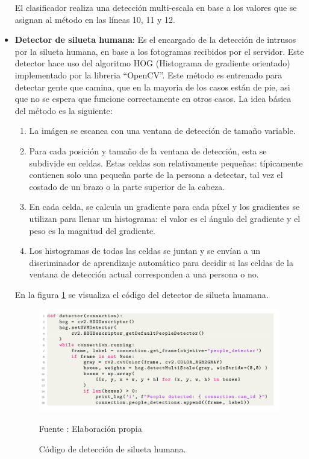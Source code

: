 \begin{itemize}
    El clasificador realiza una detección multi-escala en base a los valores que se asignan al método en las líneas 10, 11 y 12.\\
    \item \textbf{Detector de silueta humana}:
    Es el encargado de la detección de intrusos por la silueta humana, en base a los fotogramas recibidos por el servidor. Este detector hace uso del algoritmo HOG (Histograma de gradiente orientado) implementado por la libreria ``OpenCV''. Este método es entrenado para detectar gente que camina, que en la mayoria de los casos están de pie, asi que no se espera que funcione correctamente en otros casos.
    La idea básica del método es la siguiente:\\
    
    \begin{enumerate}
        \item La imágen se escanea con una ventana de detección de tamaño variable.
        \item Para cada posición y tamaño de la ventana de detección, esta se subdivide en celdas. Estas celdas son relativamente pequeñas: típicamente contienen solo una pequeña parte de la persona a detectar, tal vez el costado de un brazo o la parte superior de la cabeza.
        \item En cada celda, se calcula un gradiente para cada píxel y los gradientes se utilizan para llenar un histograma: el valor es el ángulo del gradiente y el peso es la magnitud del gradiente.
        \item Los histogramas de todas las celdas se juntan y se envían a un discriminador de aprendizaje automático para decidir si las celdas de la ventana de detección actual corresponden a una persona o no.
    \end{enumerate}
    
    En la figura \ref{fig:human_detector} se visualiza el código del detector de silueta huamana.\\
    
    \begin{figure}[H]
        \begin{center}
            \includegraphics[width=16cm]{img/capitulo_5/human_detector.png}
        \end{center}
        \begin{center}
            \caption{Código de detección de silueta humana.}
            Fuente : Elaboración propia
            \label{fig:human_detector}
        \end{center}
    \end{figure}
    

\end{itemize}
